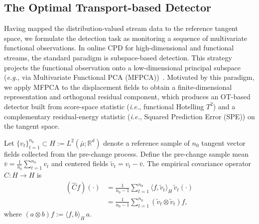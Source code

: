 \documentclass{article}
\newcommand{\ie}{\textit{i.e.}, \xspace}
\theoremstyle{plain}
\theoremstyle{definition}
\theoremstyle{remark}
\begin{document}

\subsection{The Optimal Transport-based Detector}
\label{sec:ot_detector}
Having mapped the distribution-valued stream data to the reference tangent space, we formulate the detection task as monitoring a sequence of multivariate functional observations. 
In online CPD for high-dimensional and functional streams, the standard paradigm is subspace-based detection. 
This strategy projects the functional observation onto a low-dimensional principal subspace (\textit{e.g.,} via Multivariate Functional PCA (MFPCA))~\citep{kuncheva2011change, skubalska2013random, bakdi2017new}.
Motivated by this paradigm, we apply MFPCA to the displacement fields to obtain a finite-dimensional representation and orthogonal residual component, which produces an OT-based detector built from score-space statistic (\ie functional Hotelling $T^2$) and a complementary residual-energy statistic (\ie Squared Prediction Error (SPE)) on the tangent space.


Let $\{v_t\}_{t=1}^{n_0}\subset H:=L^2(\bar\mu;\mathbb{R}^d)$ denote a reference sample of $n_0$ tangent vector fields collected from the pre-change process. 
Define the pre-change sample mean $\bar v=\frac{1}{n_0}\sum_{t=1}^{n_0} v_t$ and centered fields $\tilde v_t=v_t-\bar v$.
The empirical covariance operator $\widehat C:H\to H$ is
\begin{align}\label{eq:cov-op}
(\widehat C f)(\cdot)
& =\frac{1}{n_0-1}\sum_{t=1}^{n_0}\langle f,\tilde v_t\rangle_H\,\tilde v_t(\cdot)
\nonumber\\
& =\frac{1}{n_0-1}\sum_{t=1}^{n_0}(\tilde v_t\otimes \tilde v_t)f,
\end{align}
where $(a\otimes b)f:=\langle f,b\rangle_H\,a$.
\end{document}
